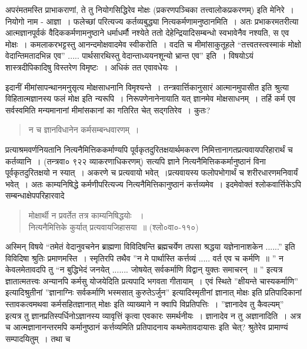 {अपरंमतमस्ति प्राभाकराणां, ते तु नियोगसिद्धिरेव मोक्षः (प्रकरणपञ्चिका तत्त्वालोक\-प्रकरणम्) इति मेनिरे~। नियोगो नाम - आज्ञा~। फलेच्छां परित्यज्य कर्तव्यबुद्ध्या नित्यकर्मणामनुष्ठानमिति~। अतः प्रभाकरमतरीत्या आत्मज्ञानपूर्वकं वैदिककर्मणामनुष्ठाने धर्माधर्मौ नश्येते ततो देहेन्द्रियादिसम्बन्धो स्वभावेनैव नश्यति, स एव मोक्षः~। कमलाकरभट्टस्तु आनन्दमोक्षवादमेव स्वीकरोति~। वदति च मीमांसाकुतूहले “तत्त्वतस्त्वस्माकं मोक्षो वेदान्तिमतादभिन्न एव” ..... पार्थसारथिस्तु वेदान्ताध्ययनशून्यो भ्रान्त एव” इति~। विषयोऽयं शास्त्रदीपिकादिषु विस्तरेण विमृष्टः~। अधिकं तत एवावधेयः~। 

इदानीं मीमांसापन्थानमनुसृत्य मोक्षसाधनानि विमृश्यन्ते~। तन्त्रवार्त्तिकानुसारं आत्मानमुपासीत इति श्रुत्या विहितात्मज्ञानस्य फलं मोक्ष इति न्यरूपि~। निरूपणेनानेनायाति यत् ज्ञानमेव मोक्षसाधनम्~। तर्हि कर्म एव सर्वस्वमिति मन्यमानानां मीमांसकानां का गतिरित चेत्  सद्गतिरेव~। कुतः?
\begin{verse}
न च ज्ञानविधानेन कर्मसम्बन्धवारणम्~। 
\end{verse}

प्रत्याश्रमवर्णनियतानि नित्यनैमित्तिककर्माण्यपि पूर्वकृतदुरितक्षयार्थमकरण निमित्तानागतप्रत्यवायपरिहारार्थं च कर्तव्यानि~। (तन्त्रवा० ९२२ व्याकरणाधिकरणम्) सत्यपि ज्ञाने नित्यनैमित्तिककर्मानुष्ठानं विना पूर्वकृतदुरितक्षयो न स्यात्~। अकरणे च प्रत्यवायो भवेत्~।\break प्रत्यवायस्य फलोपभोगार्थं च शरीरधारणमनिवार्यं भवेत्~। अतः काम्यनिषिद्धे कर्मणी\break परित्यज्य नित्यनैमित्तिकानुष्ठानं कर्त्तव्यमेव~। इदमेवोक्तं श्लोकवार्त्तिकेऽपि सम्बन्धाक्षेपपरि\-हारवादे

\begin{verse}
मोक्षार्थी न प्रवर्तेत तत्र काम्यनिषिद्धयोः ~। \\
नित्यनैमित्तिके कुर्यात् प्रत्यवायजिहासया~॥ (श्लो०वा०-११०)
\end{verse}

अस्मिन् विषये “तमेतं वेदानुवचनेन ब्राह्मणा विविदिषन्ति ब्रह्मचर्येण तपसा श्रद्धया यज्ञेनानाशकेन ......” इति विविदिषा श्रुतिः प्रमाणमस्ति~। स्मृतिरपि तथैव ”न मे पार्थास्ति कर्त्तव्यं ..... वर्त एव च कर्मणि~॥ ” न केवलमेतावदपि तु “न बुद्धिभेदं जनयेत् ....... जोषयेत् सर्वकर्माणि विद्वान् युक्तः समाचरन्~॥ ” इत्यत्र ज्ञातात्मतत्त्वः अन्यानपि कर्मसु योजयेदिति प्रत्यपादि भगवता गीतायाम्~। एवं स्थिते ”क्षीयन्ते चास्यकर्माणि” इत्यादिश्रुतीनां ”ज्ञानाग्निः सर्वकर्माणि भस्मसात् कुरुतेऽर्जुन” इत्यादिस्मृतीनां ज्ञानात् मोक्षः इति प्रतिपादिकानां स्तावकत्वमथवा कर्मसहितज्ञानात् मोक्षः इति व्याख्याने न क्वापि विप्रतिपत्तिः~। ”ज्ञानादेव तु कैवल्यम्” इत्यत्र तु ज्ञानप्रतिस्पर्धिनोऽज्ञानस्य व्यावृत्तिं कृत्वा एवकारः समर्थनीयः~। ज्ञानादेव न तु अज्ञानादिति~। अत्र च आत्मज्ञानानन्तरमपि कर्मानुष्ठानं कर्त्तव्यमिति प्रतिपादनाय कथमेतावदायासः इति चेत्? श्रुतेरेव प्रामाण्यं सम्पादयितुम्~। तथा च 

}
